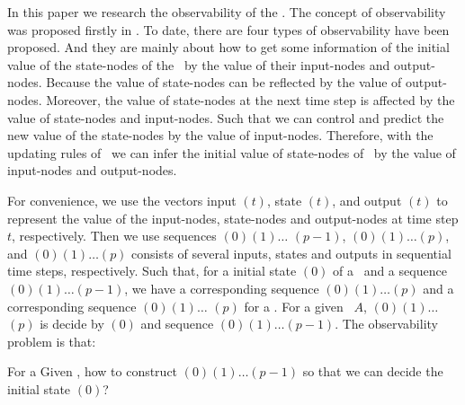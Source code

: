 In this paper we research the observability of the \BCNs. The concept of observability was proposed firstly in \cite{cheng2009controllability}. To date, there are four types of observability have been proposed. And they are mainly about how to get some information of the initial value of the state-nodes of the \BCNs\ by the value of their input-nodes and output-nodes. Because the value of state-nodes can be reflected by the value of output-nodes. Moreover, the value of state-nodes at the next time step is affected by the value of state-nodes and input-nodes. Such that we can control and predict the new value of the state-nodes by the value of input-nodes. Therefore, with the updating rules of \BCNs\ we can infer  the initial value of state-nodes of \BCNs\ by the value of input-nodes and output-nodes. %

For convenience, we use the vectors input \Input$(t)$, state \State$(t)$, and output \Output$(t)$ to represent the value of the input-nodes, state-nodes and output-nodes at time step $t$, respectively.
 Then we use   sequences \Input$(0)$\Input$(1)\ldots$
\Input$(p-1)$,  \State$(0) $\State$(1)\ldots$\State$(p)$, and   \Output$(0)$\Output$(1)\ldots$\Output$(p)$ 
 consists of several inputs, states and outputs  in sequential time steps,  respectively. 
 Such that, for a initial state \State$(0)$ of a \BCN\ and a sequence \Input$(0)$\Input$(1)\ldots$\Input$(p-1)$, we have a corresponding  sequence 
\State$(0) $\State$(1)\ldots $\State$(p)$ and a corresponding  sequence \Output$(0) $\Output$(1)\ldots$ \Output$(p)$ for a \BCN.  
For a given  \BCN\  $A$,  \Output$(0) $\Output$(1)\ldots$ \Output$(p)$ is decide by
\State$(0)$ and sequence \Input$(0)$\Input$(1)\ldots$\Input$(p-1)$.
The observability problem is that:
\begin{problem}
\label{pro:1}
For a Given  \BCN, how to   construct  \Input$(0)$\Input$(1)\ldots$\Input$(p-1)$ so that we can decide the initial state \State$(0)$?
\end{problem}

